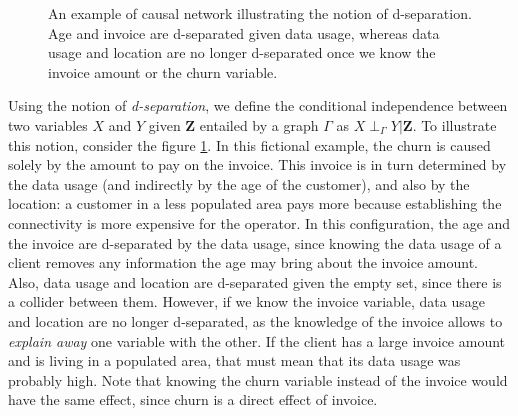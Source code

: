 \begin{figure}
    \centering
    \caption{An example of causal network illustrating the notion of
    d-separation. Age and invoice are d-separated given data usage, whereas data
    usage and location are no longer d-separated once we know the invoice amount
    or the churn variable.}
    \label{fig:d_sep}
\end{figure}

Using the notion of \emph{d-separation}, we define the conditional independence
between two variables $X$ and $Y$ given $\bm Z$ entailed by a graph $\Gamma$ as
$X\perp_\Gamma Y|\bm Z$. To illustrate this notion, consider the figure
\ref{fig:d_sep}. In this fictional example, the churn is caused solely by the
amount to pay on the invoice. This invoice is in turn determined by the data
usage (and indirectly by the age of the customer), and also by the location: a
customer in a less populated area pays more because establishing the
connectivity is more expensive for the operator. In this configuration, the age
and the invoice are d-separated by the data usage, since knowing the data usage
of a client removes any information the age may bring about the invoice amount.
Also, data usage and location are d-separated given the empty set, since there
is a collider between them. However, if we know the invoice variable, data usage
and location are no longer d-separated, as the knowledge of the invoice allows
to \emph{explain away} one variable with the other. If the client has a large
invoice amount and is living in a populated area, that must mean that its data
usage was probably  high. Note that knowing the churn variable instead of the
invoice would have the same effect, since churn is a direct effect of invoice.

